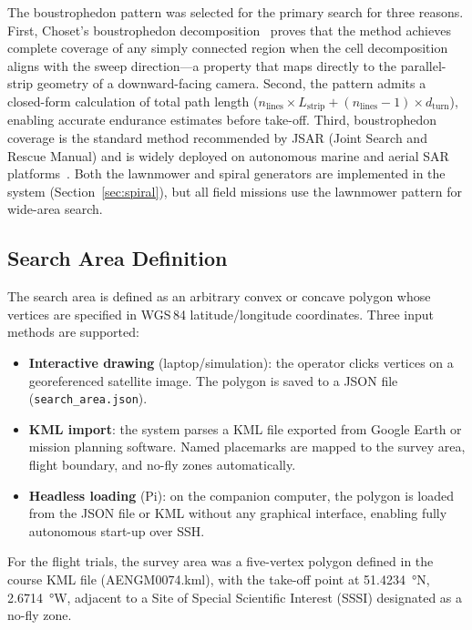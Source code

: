 The boustrophedon pattern was selected for the primary search for three reasons. First, Choset's boustrophedon decomposition~\cite{choset2001coverage} proves that the method achieves complete coverage of any simply connected region when the cell decomposition aligns with the sweep direction---a property that maps directly to the parallel-strip geometry of a downward-facing camera. Second, the pattern admits a closed-form calculation of total path length ($n_{\text{lines}} \times L_{\text{strip}} + (n_{\text{lines}} - 1) \times d_{\text{turn}}$), enabling accurate endurance estimates before take-off. Third, boustrophedon coverage is the standard method recommended by JSAR (Joint Search and Rescue Manual) and is widely deployed on autonomous marine and aerial SAR platforms~\cite{galceran2013survey}. Both the lawnmower and spiral generators are implemented in the system (Section~\ref{sec:spiral}), but all field missions use the lawnmower pattern for wide-area search.

\subsection{Search Area Definition}\label{sec:area-def}

The search area is defined as an arbitrary convex or concave polygon whose vertices are specified in WGS\,84 latitude/longitude coordinates. Three input methods are supported:

\begin{itemize}
  \item \textbf{Interactive drawing} (laptop/simulation): the operator clicks vertices on a georeferenced satellite image. The polygon is saved to a JSON file (\texttt{search\_area.json}).
  \item \textbf{KML import}: the system parses a KML file exported from Google Earth or mission planning software. Named placemarks are mapped to the survey area, flight boundary, and no-fly zones automatically.
  \item \textbf{Headless loading} (Pi): on the companion computer, the polygon is loaded from the JSON file or KML without any graphical interface, enabling fully autonomous start-up over SSH.
\end{itemize}

For the flight trials, the survey area was a five-vertex polygon defined in the course KML file (AENGM0074.kml), with the take-off point at \SI{51.4234}{\degree}N, \SI{2.6714}{\degree}W, adjacent to a Site of Special Scientific Interest (SSSI) designated as a no-fly zone.

